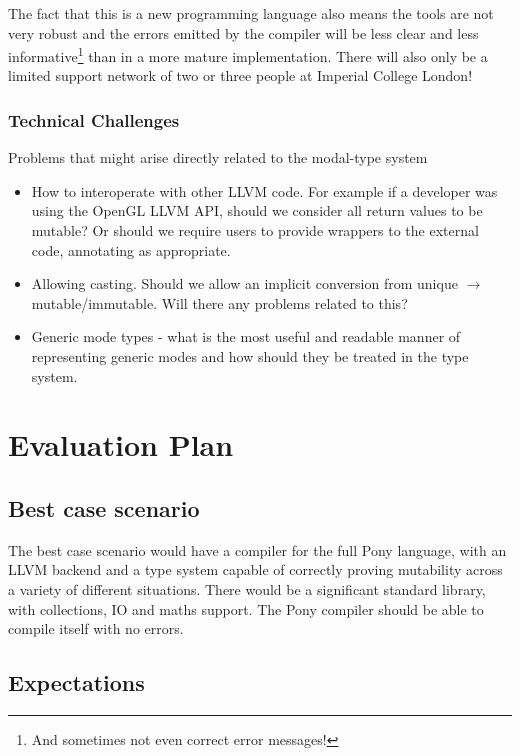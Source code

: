 \documentclass{article}
\begin{document}
The fact that this is a new programming language also means the tools are not very robust and the errors emitted by the compiler will be less clear and less informative\footnote{And sometimes not even correct error messages!} than in a more mature implementation.
There will also only be a limited support network of two or three people at Imperial College London!

\subsubsection{Technical Challenges}

Problems that might arise directly related to the modal-type system
	\begin{itemize}
		\item How to interoperate with other LLVM code. For example if a developer was using the OpenGL LLVM API, should we consider all return values to be mutable?
			Or should we require users to provide wrappers to the external code, annotating as appropriate.
		\item Allowing casting. Should we allow an implicit conversion from unique $\to$ mutable/immutable.
			Will there any problems related to this?
		\item Generic mode types - what is the most useful and readable manner of representing generic modes and how should they be treated in the type system.
	\end{itemize}

\section{Evaluation Plan}

\subsection{Best case scenario}

The best case scenario would have a compiler for the full Pony language, with an LLVM backend and a type system capable of correctly proving mutability across a variety of different situations.
There would be a significant standard library, with collections, IO and maths support.
The Pony compiler should be able to compile itself with no errors.

\subsection{Expectations}
\end{document}
